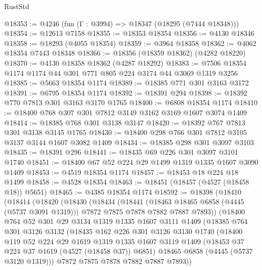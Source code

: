 \begin{lexlean}{RustStd}
\begin{coremodule}
@18353 := @4246 (fun (Γ : @3994) => @18347 (@18295 (@7444 @18348)))
@18354 := @12613 @7158
@18355 := @18353 @18354
@18356 := @4130 @18346
@18358 := @18293 (@4055 @18354)
@18359 := @3964 @18358
@18362 := @4062 @18354 @7443 @18348
@18366 := @18356 (@18359 @18362) (@4282 @18220)
@18370 := @4130 @18358 @18362 (@4287 @18292)
@18383 := @7506 @18354 @1174 @1174 @44 @301 @771 @805 @224 @3174 @44 @3069 @1319 @3256
@18385 := @5663 @18354 @1174
@18389 := @18385 @771 @301 @3163 @3172
@18391 := @6795 @18354 @1174
@18392 := @18391 @294
@18398 := @18392 @770 @7813 @301 @3163 @3170 @1765
@18400 := @6808 @18354 @1174
@18410 := @18400 @768 @307 @301 @7812 @3149 @3162 @3169 @1607 @3074 @1409
@18414 := @18385 @768 @301 @3138 @3147
@18420 := @18392 @767 @7813 @301 @3138 @3145 @1765
@18430 := @18400 @298 @766 @301 @7812 @3105 @3137 @3144 @1607 @3082 @1409
@18434 := @18385 @298 @301 @3097 @3103
@18435 := @18391 @296
@18441 := @18435 @69 @226 @301 @3097 @3101 @1740
@18451 := @18400 @67 @52 @224 @29 @1499 @1319 @1335 @1607 @3090 @1409
@18453 := @4519 @18354 @1174
@18457 := @18453 @18 @224 @18 @1499
@18458 := @4528 @18354
@18463 := @18451 (@18457 (@4527 (@18458 @18)) @5651)
@18465 := @4385 @18354 @1174
@18592 := @18398
    (@18410
      (@18414
        (@18420
          (@18430
            (@18434
              (@18441
                (@18463 @18465 @6858 (@4445 (@5737 @3091 @1319)))
                @7872
                @7875
                @7878
                @7882
                @7887
                @7893))
            (@18400
              @764
              @52
              @301
              @29
              @3134
              @1319
              @1335
              @1607
              @3111
              @1409
              (@18385
                @764
                @301
                @3126
                @3132
                (@18435
                  @162
                  @226
                  @301
                  @3126
                  @3130
                  @1740
                  (@18400
                    @119
                    @52
                    @224
                    @29
                    @1619
                    @1319
                    @1335
                    @1607
                    @3119
                    @1409
                    (@18453 @37 @224 @37 @1619 (@4527 (@18458 @37)) @6851)
                    @18465
                    @6858
                    (@4445 (@5737 @3120 @1319)))
                  @7872
                  @7875
                  @7878
                  @7882
                  @7887
                  @7893))

\end{coremodule}
\end{lexlean}
